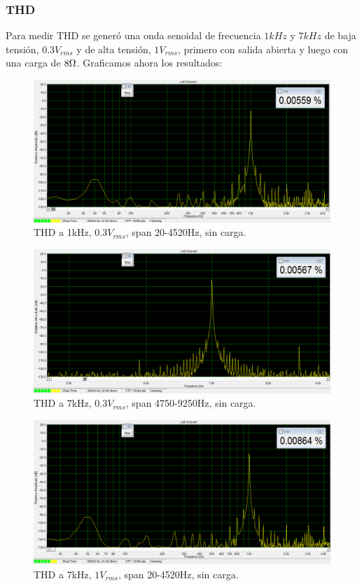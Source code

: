 \subsubsection*{THD}

Para medir THD se generó una onda senoidal de frecuencia $1kHz$ y $7kHz$ de baja tensión, $0.3V_{rms}$ y de alta tensión, $1V_{rms}$, primero con salida abierta y luego con una carga de $8\ohm$. Graficamos ahora los resultados:

\begin{figure}[H]
\centering
\includegraphics[width=\textwidth]{img/Distorsion/THD_1k_03V_span_20_4520.png}
\caption{THD a 1kHz, $0.3V_{rms}$, span 20-4520Hz, sin carga.}
\label{THD1} 
\end{figure}

\begin{figure}[H]
\centering
\includegraphics[width=\textwidth]{img/Distorsion/THD_7k_03V_span_4750_9250.png}
\caption{THD a 7kHz, $0.3V_{rms}$, span 4750-9250Hz, sin carga.}
\label{THD2} 
\end{figure}

\begin{figure}[H]
\centering
\includegraphics[width=\textwidth]{img/Distorsion/THD_1k_1V_span_20_4520.png}
\caption{THD a 7kHz, $1V_{rms}$, span 20-4520Hz, sin carga.}
\label{THD3} 
\end{figure}

